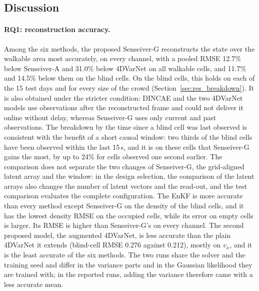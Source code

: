 \documentclass[english, 12pt, a4paper, elec, utf8, a-2b, online]{aaltothesis}
\begin{document}
\subsection{Discussion}
\label{sec:discussion}

\paragraph{RQ1: reconstruction accuracy.}
Among the six methods, the proposed Senseiver\nobreakdash-G reconstructs the state over
the walkable area most accurately, on every channel, with a pooled RMSE 12.7\%
below Senseiver\nobreakdash-A and 31.0\% below 4DVarNet on all walkable cells, and 11.7\%
and 14.5\% below them on the blind cells. On the blind cells, this holds on
each of the 15 test days and for every size of the crowd
(Section~\ref{sec:res_breakdown}). It is also obtained under the stricter
condition: DINCAE and the two 4DVarNet models use observations after the reconstructed frame
and could not deliver it online without delay, whereas Senseiver\nobreakdash-G uses only
current and past observations. The breakdown by the time since a blind cell was last observed
is consistent with the benefit of a short causal window: two thirds of the blind
cells have been observed within the last 15\,s, and it is on these cells
that Senseiver\nobreakdash-G gains the most, by up to 24\% for cells observed one second
earlier. The comparison does not separate the two changes of Senseiver\nobreakdash-G, the
grid-aligned latent array and the window: in the design selection, the comparison of
the latent arrays also changes the number
of latent vectors and the read-out, and the test comparison evaluates the
complete configuration. The EnKF is more accurate than
every method except Senseiver\nobreakdash-G on the density of the blind cells, and it has
the lowest density RMSE on the occupied cells, while its error on empty cells
is larger. Its RMSE is higher than Senseiver\nobreakdash-G's on every channel.
The second proposed model, the augmented 4DVarNet, is less accurate than the
plain 4DVarNet it extends (blind-cell RMSE 0.276 against 0.212), mostly on
$v_x$, and it is the least accurate of the six methods. The two runs share the
solver and the training seed and differ in the variance parts and in the
Gaussian likelihood they are trained with; in the reported runs, adding the
variance therefore came with a less accurate mean.
\end{document}
